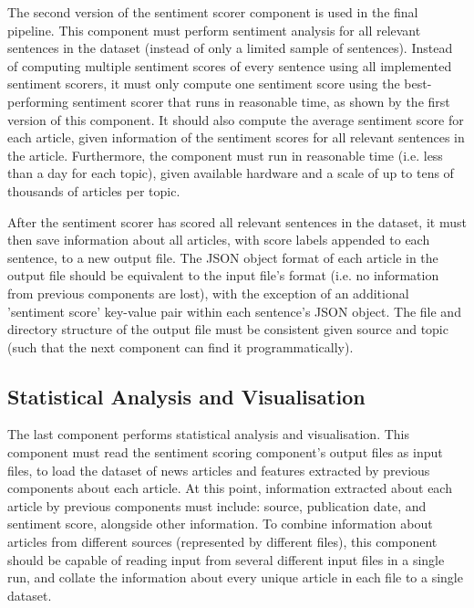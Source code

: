 \documentclass{report}
\begin{document}
The second version of the sentiment scorer component is used in the final pipeline.
This component must perform sentiment analysis for all relevant sentences in the dataset (instead of only a limited sample of sentences).
Instead of computing multiple sentiment scores of every sentence using all implemented sentiment scorers, it must only compute one sentiment score using the best-performing sentiment scorer that runs in reasonable time, as shown by the first version of this component.
It should also compute the average sentiment score for each article, given information of the sentiment scores for all relevant sentences in the article.
Furthermore, the component must run in reasonable time (i.e. less than a day for each topic), given available hardware and a scale of up to tens of thousands of articles per topic.

After the sentiment scorer has scored all relevant sentences in the dataset, it must then save information about all articles, with score labels appended to each sentence, to a new output file.
The JSON object format of each article in the output file should be equivalent to the input file's format (i.e. no information from previous components are lost), with the exception of an additional 'sentiment score' key-value pair within each sentence's JSON object.
The file and directory structure of the output file must be consistent given source and topic (such that the next component can find it programmatically).

\subsection{Statistical Analysis and Visualisation}

The last component performs statistical analysis and visualisation.
This component must read the sentiment scoring component's output files as input files, to load the dataset of news articles and features extracted by previous components about each article.
At this point, information extracted about each article by previous components must include: source, publication date, and sentiment score, alongside other information.
To combine information about articles from different sources (represented by different files), this component should be capable of reading input from several different input files in a single run, and collate the information about every unique article in each file to a single dataset.
\end{document}
